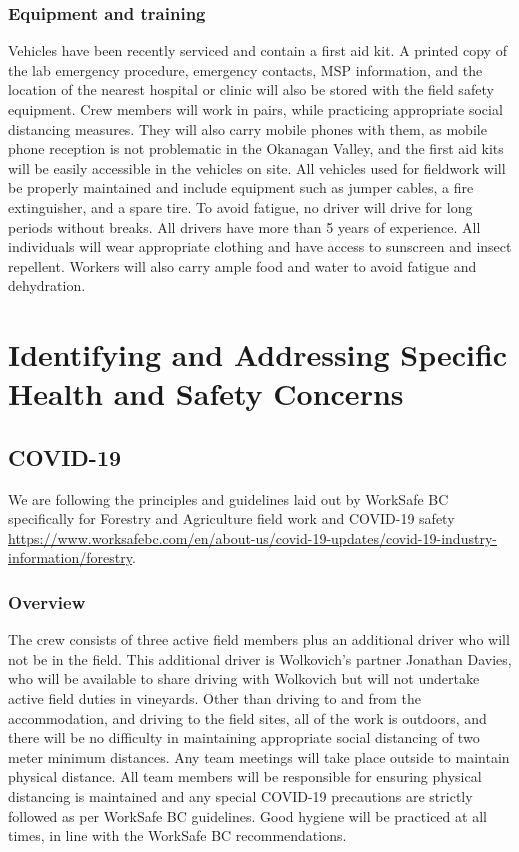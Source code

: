 \documentclass[11pt,letter]{article}
\begin{document}
\subsubsection{Equipment and training}
Vehicles have been recently serviced and contain a first aid kit. A printed copy of the lab emergency procedure, emergency contacts, MSP information, and the location of the nearest hospital or clinic will also be stored with the field safety equipment. Crew members will work in pairs, while practicing appropriate social distancing measures. They will also carry mobile phones with them, as mobile phone reception is not problematic in the Okanagan Valley, and the first aid kits will be easily accessible in the vehicles on site. All vehicles used for fieldwork will be properly maintained and include equipment such as jumper cables, a fire extinguisher, and a spare tire. To avoid fatigue, no driver will drive for long periods without breaks. All drivers have more than 5 years of experience. All individuals will wear appropriate clothing and have access to sunscreen and insect repellent. Workers will also carry ample food and water to avoid fatigue and dehydration.  


\section{Identifying and Addressing Specific Health and Safety Concerns}

\subsection{COVID-19}

We are following the principles and guidelines laid out by WorkSafe BC specifically for Forestry and Agriculture field work and COVID-19 safety \url{https://www.worksafebc.com/en/about-us/covid-19-updates/covid-19-industry-information/forestry}. 

\subsubsection{Overview}
The crew consists of three active field members plus an additional driver who will not be in the field. This additional driver is Wolkovich's partner Jonathan Davies, who will be available to share driving with Wolkovich but will not undertake active field duties in vineyards. Other than driving to and from the accommodation, and driving to the field sites, all of the work is outdoors, and there will be no difficulty in maintaining appropriate social distancing of two meter minimum distances. Any team meetings will take place outside to maintain physical distance. All team members will be responsible for ensuring physical distancing is maintained and any special COVID-19 precautions are strictly followed as per WorkSafe BC guidelines. Good hygiene will be practiced at all times, in line with the  WorkSafe BC recommendations. 
\end{document}
